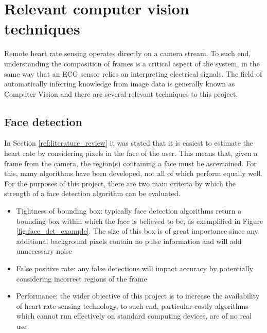 \section{Relevant computer vision techniques}
Remote heart rate sensing operates directly on a camera stream. To such end, understanding the composition of frames is a critical 
aspect of the system, in the same way that an ECG sensor relies on interpreting electrical signals. 
The field of automatically inferring knowledge from image data is generally known as Computer Vision and there are several relevant techniques to this project.

\subsection{Face detection}
In Section \ref{ref:literature_review} it was stated that it is 
easiest to estimate the heart rate by considering pixels in the face of the user. 
This means that, given a frame from the camera, the region(s) containing a face must be ascertained. For this, many algorithms have been developed, not all of which perform equally well.
For the purposes of this project, there are two main criteria by which the strength of a face detection algorithm can be evaluated.
\begin{itemize}
    \item Tightness of bounding box: typically face detection algorithms return a bounding box within which the face is believed to be, as exemplified in Figure \ref{fig:face_det_example}. The size of this box is of great importance since any additional background pixels contain no pulse information and will add unnecessary noise
    \item False positive rate: any false detections will impact accuracy by potentially considering incorrect regions of the frame
    \item Performance: the wider objective of this project is to increase the availability of heart rate sensing technology, to such end, particular costly algorithms which cannot run effectively on standard computing devices, are of no real use
\end{itemize}


